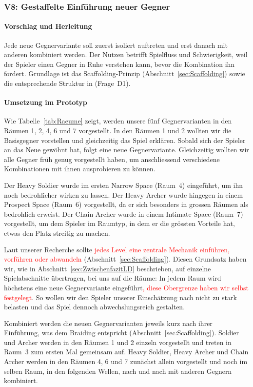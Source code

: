 \documentclass[../Main.tex]{subfiles}
\begin{document}
\subsubsection{V8: Gestaffelte Einführung neuer Gegner} \label{sec:V8}

\paragraph{Vorschlag und Herleitung}
Jede neue Gegnervariante soll zuerst isoliert auftreten und erst danach mit anderen kombiniert werden. Der Nutzen betrifft Spielfluss und Schwierigkeit, weil der Spieler einen Gegner in Ruhe verstehen kann, bevor die Kombination ihn fordert. Grundlage ist das Scaffolding-Prinzip (Abschnitt~\ref{sec:Scaffolding}) sowie die entsprechende Struktur in  (Frage~D1).

\paragraph{Umsetzung im Prototyp}
Wie Tabelle~\ref{tab:Raeume} zeigt, werden unsere fünf Gegnervarianten in den Räumen 1, 2, 4, 6 und 7 vorgestellt. In den Räumen 1 und 2 wollten wir die Basisgegner vorstellen und gleichzeitig das Spiel erklären. Sobald sich der Spieler an das Neue gewöhnt hat, folgt eine neue Gegnervariante. Gleichzeitig wollten wir alle Gegner früh genug vorgestellt haben, um anschliessend verschiedene Kombinationen mit ihnen ausprobieren zu können.

Der Heavy Soldier wurde im ersten Narrow Space (Raum~4) eingeführt, um ihn noch bedrohlicher wirken zu lassen. Der Heavy Archer wurde hingegen in einem Prospect Space (Raum~6) vorgestellt, da er sich besonders in grossen Räumen als bedrohlich erweist. Der Chain Archer wurde in einem Intimate Space (Raum~7) vorgestellt, um dem Spieler im Raumtyp, in dem er die grössten Vorteile hat, etwas den Platz streitig zu machen.

Laut unserer Recherche sollte \textcolor{red}{jedes Level eine zentrale Mechanik einführen, vorführen oder abwandeln} (Abschnitt~\ref{sec:Scaffolding}). Diesen Grundsatz haben wir, wie in Abschnitt~\ref{sec:ZwischenfazitLD} beschrieben, auf einzelne Spielabschnitte übertragen, bei uns auf die Räume: In jedem Raum wird höchstens eine neue Gegnervariante eingeführt\textcolor{red}{, diese Obergrenze haben wir selbst festgelegt}. So wollen wir den Spieler unserer Einschätzung nach nicht zu stark belasten und das Spiel dennoch abwechslungsreich gestalten.

Kombiniert werden die neuen Gegnervarianten jeweils kurz nach ihrer Einführung, was dem Braiding entspricht (Abschnitt~\ref{sec:Scaffolding}). Soldier und Archer werden in den Räumen 1 und 2 einzeln vorgestellt und treten in Raum~3 zum ersten Mal gemeinsam auf. Heavy Soldier, Heavy Archer und Chain Archer werden in den Räumen 4, 6 und 7 zunächst allein vorgestellt und noch im selben Raum, in den folgenden Wellen, nach und nach mit anderen Gegnern kombiniert.
\end{document}
